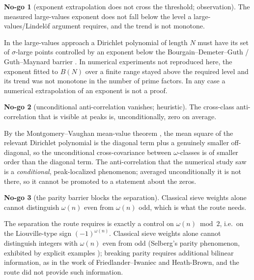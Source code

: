 \documentclass[11pt]{amsart}
\theoremstyle{definition}
\theoremstyle{remark}
\theoremstyle{definition}
\newtheorem{nogo}{No-go}[section]
\begin{document}
\begin{nogo}[exponent extrapolation does not cross the threshold; observation]\label{ng:extrap}
The measured large-values exponent does not fall below the level a large-values/Lindel\"of argument requires,
and the trend is not monotone.
\end{nogo}
\noindent In the large-values approach a Dirichlet polynomial of length $N$ must have its set of
$\sigma$-large points controlled by an exponent below the Bourgain--Demeter--Guth / Guth--Maynard barrier
\cite{BourgainDemeterGuth,GuthMaynard}. In numerical experiments not reproduced here, the exponent fitted
to $B(N)$ over a finite range stayed above the required level and its trend was not monotone in the number
of prime factors. In any case a numerical extrapolation of an exponent is not a proof.

\begin{nogo}[unconditional anti-correlation vanishes; heuristic]\label{ng:mv}
The cross-class anti-correlation that is visible at peaks is, unconditionally, zero on average.
\end{nogo}
\noindent By the Montgomery--Vaughan mean-value theorem \cite{IwaniecKowalski}, the mean square of the
relevant Dirichlet polynomial is the diagonal term plus a genuinely smaller off-diagonal, so the
unconditional cross-covariance between $\omega$-classes is of smaller order than the diagonal term. The anti-correlation that the
numerical study saw is a \emph{conditional}, peak-localized phenomenon; averaged unconditionally it is not
there, so it cannot be promoted to a statement about the zeros.

\begin{nogo}[the parity barrier blocks the separation]\label{ng:parity}
Classical sieve weights alone cannot distinguish $\omega(n)$ even from $\omega(n)$ odd, which is what the
route needs.
\end{nogo}
\noindent The separation the route requires is exactly a control on $\omega(n)\bmod2$, i.e.\ on the
Liouville-type sign $(-1)^{\omega(n)}$. Classical sieve weights alone cannot distinguish integers with
$\omega(n)$ even from odd (Selberg's parity phenomenon, exhibited by explicit examples
\cite{IwaniecKowalski}); breaking parity requires additional bilinear information, as in the work of
Friedlander--Iwaniec and Heath-Brown, and the route did not provide such information.
\end{document}
